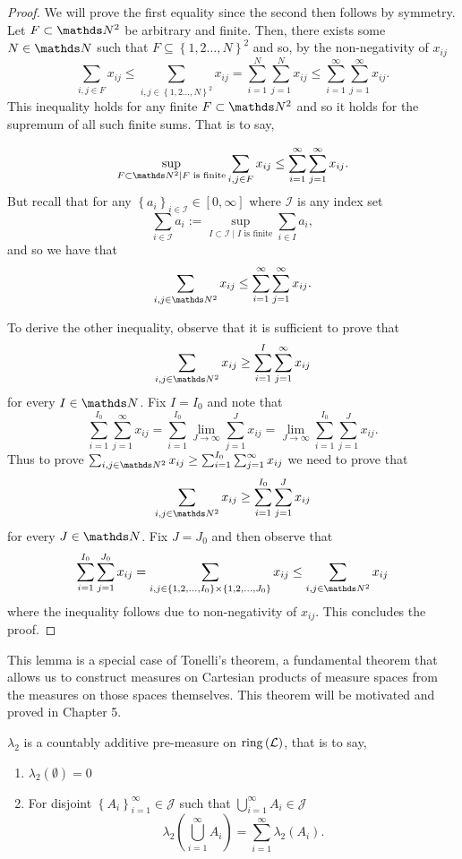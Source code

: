 \begin{proof}
We will prove the first equality since the second then follows by
symmetry. Let $F\subset\N^{2}$ be arbitrary and finite. Then, there
exists some $N\in\N$ such that $F\subseteq\left\{ 1,2\ldots,N\right\} ^{2}$
and so, by the non-negativity of $x_{ij}$
\[
\sum_{i,j\in F}x_{ij}\leq\sum_{i,j\in\left\{ 1,2\ldots,N\right\} ^{2}}x_{ij}=\sum_{i=1}^{N}\sum_{j=1}^{N}x_{ij}\leq\sum_{i=1}^{\infty}\sum_{j=1}^{\infty}x_{ij}.
\]
This inequality holds for any finite $F\subset\N^{2}$ and so it holds
for the supremum of all such finite sums. That is to say,

\[
\sup_{F\subset\N^{2}\mid F\text{ is finite}}\sum_{i,j\in F}x_{ij}\leq\sum_{i=1}^{\infty}\sum_{j=1}^{\infty}x_{ij}.
\]
But recall that for any $\left\{ a_{i}\right\} _{i\in\mathcal{I}}\in\left[0,\infty\right]$
where $\mathcal{I}$ is any index set
\[
\sum_{i\in\mathcal{I}}a_{i}:=\sup_{I\subset\mathcal{I}\mid I\text{ is finite}}\sum_{i\in I}a_{i},
\]
and so we have that
\[
\sum_{i,j\in\N^{2}}x_{ij}\leq\sum_{i=1}^{\infty}\sum_{j=1}^{\infty}x_{ij}.
\]

To derive the other inequality, observe that it is sufficient to prove
that
\[
\sum_{i,j\in\N^{2}}x_{ij}\geq\sum_{i=1}^{I}\sum_{j=1}^{\infty}x_{ij}
\]
for every $I\in\N$. Fix $I=I_{0}$ and note that
\[
\sum_{i=1}^{I_{0}}\sum_{j=1}^{\infty}x_{ij}=\sum_{i=1}^{I_{0}}\lim_{J\to\infty}\sum_{j=1}^{J}x_{ij}=\lim_{J\to\infty}\sum_{i=1}^{I_{0}}\sum_{j=1}^{J}x_{ij}.
\]
Thus to prove $\sum_{i,j\in\N^{2}}x_{ij}\geq\sum_{i=1}^{I_{0}}\sum_{j=1}^{\infty}x_{ij}$
we need to prove that 
\[
\sum_{i,j\in\N^{2}}x_{ij}\geq\sum_{i=1}^{I_{0}}\sum_{j=1}^{J}x_{ij}
\]
for every $J\in\N$. Fix $J=J_{0}$ and then observe that
\[
\sum_{i=1}^{I_{0}}\sum_{j=1}^{J_{0}}x_{ij}=\sum_{i,j\in\left\{ 1,2,\ldots,I_{0}\right\} \times\left\{ 1,2,\ldots,J_{0}\right\} }x_{ij}\leq\sum_{i,j\in\N^{2}}x_{ij}
\]
where the inequality follows due to non-negativity of $x_{ij}$. This
concludes the proof.
\end{proof}
\begin{rem*}
This lemma is a special case of Tonelli's theorem, a fundamental theorem
that allows us to construct measures on Cartesian products of measure
spaces from the measures on those spaces themselves. This theorem
will be motivated and proved in Chapter 5.
\end{rem*}
\begin{prop}
\label{prop:ringMeasureCountablyAdditive} $\lambda_{2}$ is a countably
additive pre-measure on $\mathrm{ring}\left(\mathcal{L}\right)$, that is
to say,

\begin{enumerate}[label=(\roman*),leftmargin=.1\linewidth,rightmargin=.4\linewidth]
	\item $\lambda_2\left(\emptyset\right) = 0$ 
	\item For disjoint $\left\{A_i\right\}_{i=1}^{\infty}\in \mathcal{J}$ such that $\bigcup_{i=1}^{\infty}A_i \in \mathcal{J}$
	\[
			\lambda_2\left(\bigcup_{i=1}^{\infty}A_i\right) = \sum_{i=1}^{\infty}\lambda_2\left(A_i\right).
	\]
\end{enumerate}
\end{prop}

